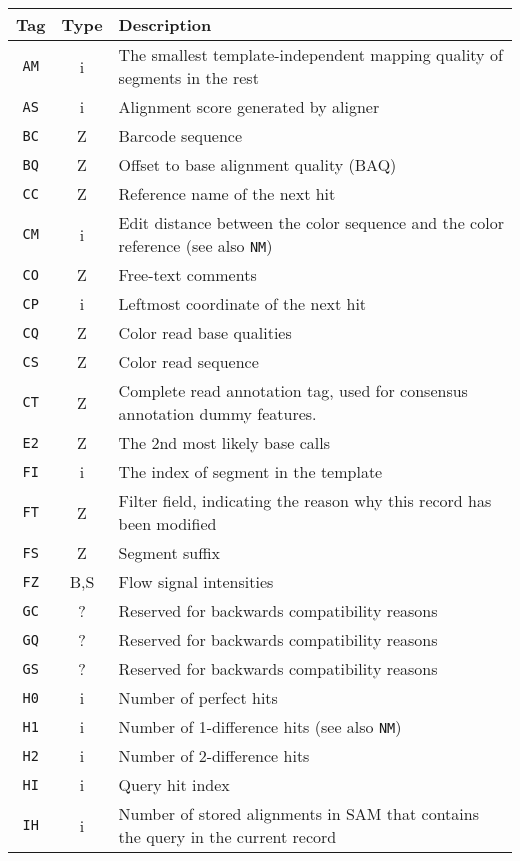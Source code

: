 \documentclass[10pt]{article}
\begin{document}
\begin{center}\small
\begin{longtable}{ccp{12.5cm}}
  \hline
  {\bf Tag} & {\bf Type} & {\bf Description} \\
  \hline
  {\tt AM} & i & The smallest template-independent mapping quality of segments in the rest \\
  {\tt AS} & i & Alignment score generated by aligner \\
  {\tt BC} & Z & Barcode sequence \\
  {\tt BQ} & Z & Offset to base alignment quality (BAQ) \\
  {\tt CC} & Z & Reference name of the next hit \\
  {\tt CM} & i & Edit distance between the color sequence and the color reference (see also {\tt NM})\\
  {\tt CO} & Z & Free-text comments \\
  {\tt CP} & i & Leftmost coordinate of the next hit \\
  {\tt CQ} & Z & Color read base qualities \\
  {\tt CS} & Z & Color read sequence \\
  {\tt CT} & Z & Complete read annotation tag, used for consensus annotation dummy features.\\
  {\tt E2} & Z & The 2nd most likely base calls \\
  {\tt FI} & i & The index of segment in the template \\
  {\tt FT} & Z & Filter field, indicating the reason why this record has been modified\\ 
  {\tt FS} & Z & Segment suffix \\
  {\tt FZ} & B,S & Flow signal intensities \\
  {\tt GC} & ? & Reserved for backwards compatibility reasons \\
  {\tt GQ} & ? & Reserved for backwards compatibility reasons \\
  {\tt GS} & ? & Reserved for backwards compatibility reasons \\
  {\tt H0} & i & Number of perfect hits \\
  {\tt H1} & i & Number of 1-difference hits (see also {\tt NM}) \\
  {\tt H2} & i & Number of 2-difference hits \\
  {\tt HI} & i & Query hit index \\
  {\tt IH} & i & Number of stored alignments in SAM that contains the query in the current record\\

\end{longtable}
\end{center}
\end{document}
